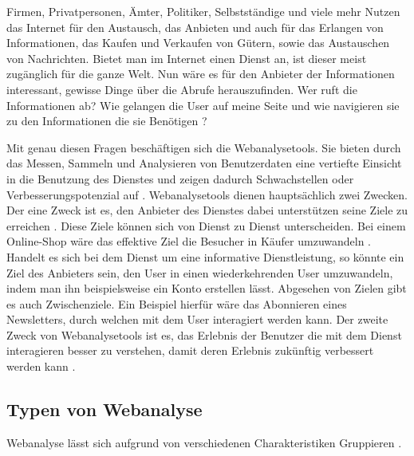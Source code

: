 Firmen, Privatpersonen, Ämter, Politiker, Selbstständige und viele mehr Nutzen das Internet für den Austausch, das Anbieten und auch für das Erlangen von Informationen, das Kaufen und Verkaufen von Gütern, sowie das Austauschen von Nachrichten. Bietet man im Internet einen Dienst an, ist dieser meist zugänglich für die ganze Welt. Nun wäre es für den Anbieter der Informationen interessant, gewisse Dinge über die Abrufe herauszufinden. Wer ruft die Informationen ab? Wie gelangen die User auf meine Seite und wie navigieren sie zu den Informationen die sie Benötigen \parencite[S. 175]{nakatani2011toolselectionmethod}?

Mit genau diesen Fragen beschäftigen sich die Webanalysetools. Sie bieten durch das Messen, Sammeln und Analysieren von Benutzerdaten eine vertiefte Einsicht in die Benutzung des Dienstes und zeigen dadurch Schwachstellen oder Verbesserungspotenzial auf \parencite[S. 1]{waisberg2009webShort}. 
Webanalysetools dienen hauptsächlich zwei Zwecken. Der eine Zweck ist es, den Anbieter des Dienstes dabei unterstützen seine Ziele zu erreichen \parencite[S. 56]{AnalyticsForDummies}. Diese Ziele können sich von Dienst zu Dienst unterscheiden. Bei einem Online-Shop wäre das effektive Ziel die Besucher in Käufer umzuwandeln \parencite[S. 28]{AnalyticsForDummies}. Handelt es sich bei dem Dienst um eine informative Dienstleistung, so könnte ein Ziel des Anbieters sein, den User in einen wiederkehrenden User umzuwandeln, indem man ihn beispielsweise ein Konto erstellen lässt. Abgesehen von Zielen gibt es auch Zwischenziele. Ein Beispiel hierfür wäre das Abonnieren eines Newsletters, durch welchen mit dem User interagiert werden kann. Der zweite Zweck von Webanalysetools ist es, das Erlebnis der Benutzer die mit dem Dienst interagieren besser zu verstehen, damit deren Erlebnis zukünftig verbessert werden kann \parencite[S. 1]{waisberg2009webShort}.

\subsection{Typen von Webanalyse}

Webanalyse lässt sich aufgrund von verschiedenen Charakteristiken Gruppieren \parencite[S. 172-174]{nakatani2011toolselectionmethod}.

